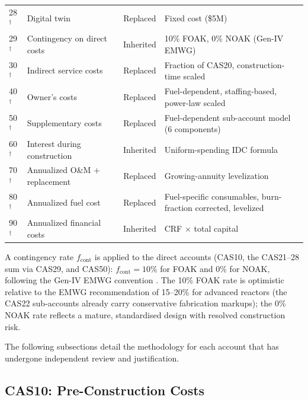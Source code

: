 \documentclass{article}
\begin{document}
\begin{table}[htbp]
\begin{tabular}{llcp{6.0cm}}
28$^\dagger$ & Digital twin & Replaced & Fixed cost (\$5M) \\
29$^\dagger$ & Contingency on direct costs & Inherited & 10\% FOAK, 0\% NOAK (Gen-IV EMWG) \\
30$^\dagger$ & Indirect service costs & Replaced & Fraction of CAS20, construction-time scaled \\
40$^\dagger$ & Owner's costs & Replaced & Fuel-dependent, staffing-based, power-law scaled \\
50$^\dagger$ & Supplementary costs & Replaced & Fuel-dependent sub-account model (6 components) \\
60$^\dagger$ & Interest during construction & Inherited & Uniform-spending IDC formula \\
70$^\dagger$ & Annualized O\&M + replacement & Replaced & Growing-annuity levelization \\
80$^\dagger$ & Annualized fuel cost & Replaced & Fuel-specific consumables, burn-fraction corrected, levelized \\
90$^\dagger$ & Annualized financial costs & Inherited & CRF $\times$ total capital \\
\bottomrule
\end{tabular}
\end{table}

A contingency rate $f_{\text{cont}}$ is applied to the direct accounts
(CAS10, the CAS21--28 sum via CAS29, and CAS50): $f_{\text{cont}} =
10\%$ for FOAK and $0\%$ for NOAK, following the Gen-IV EMWG convention
\citep{emwg2007}. The 10\% FOAK rate is optimistic relative to the EMWG
recommendation of 15--20\% for advanced reactors (the CAS22 sub-accounts
already carry conservative fabrication markups); the 0\% NOAK rate
reflects a mature, standardised design with resolved construction risk.

The following subsections detail the methodology for each account
that has undergone independent review and justification.


\subsection{CAS10: Pre-Construction Costs}
\label{sec:cas10}
\end{document}
